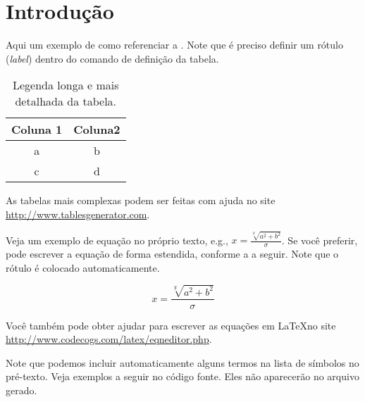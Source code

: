 \chapter{Introdução}\label{chp:Introducao}

\lipsum[1]

Aqui um exemplo de como referenciar a . Note que é preciso definir um rótulo (\textit{label}) dentro do comando de definição da tabela.

\begin{table}[!htp]
\caption[Legenda curta da tabela]{Legenda longa e mais detalhada da tabela.}
\label{tab:tabela_1}
\begin{center}
\begin{tabular}{|c|c|}
\hline
Coluna 1 & Coluna2 \\ \hline\hline
a & b \\\hline
c & d \\\hline
\end{tabular}
\end{center}
\end{table}

As tabelas mais complexas podem ser feitas com ajuda no site \href{http://www.tablesgenerator.com}{http://www.tables\-ge\-ne\-ra\-tor.com}.

Veja um exemplo de equação no próprio texto, e.g., $x=\frac{\sqrt[y]{a^{2}+b^{2}}}{\sigma}$.  Se você preferir, pode escrever a equação de forma estendida, conforme a  a seguir. Note que o rótulo é colocado automaticamente.

\begin{equation}
x=\frac{\sqrt[y]{a^{2}+b^{2}}}{\sigma}
\label{eq:teste}
\end{equation}

Você também pode obter ajudar para escrever as equações em \LaTeX no site \url{http://www.codecogs.com/latex/eqneditor.php}.

Note que podemos incluir automaticamente alguns termos na lista de símbolos no pré-texto. Veja exemplos a seguir no código fonte. Eles não aparecerão no arquivo gerado. 

%
%

